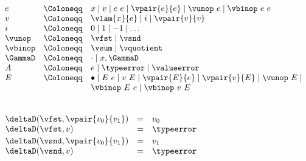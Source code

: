 \begin{flushleft}

$\begin{array}{l c l}
  e & \Coloneqq & x \mid v \mid e~e \mid \vpair{e}{e} \mid \vunop~e \mid \vbinop~e~e
\\
  v & \Coloneqq & \vlam{x}{e} \mid i \mid \vpair{v}{v}
\\
  i & \Coloneqq & 0 \mid 1 \mid -1 \mid \ldots
\\
  \vunop & \Coloneqq & \vfst \mid \vsnd
\\
  \vbinop & \Coloneqq & \vsum \mid \vquotient
\\
  \GammaD & \Coloneqq & \cdot \mid x,\GammaD
\\
  A & \Coloneqq & e \mid \typeerror \mid \valueerror
\\
  E & \Coloneqq & \bullet \mid E~e \mid v~E \mid
                  \vpair{E}{e} \mid \vpair{v}{E} \mid \vunop~E \mid
\\ & &            \vbinop~E~e \mid \vbinop~v~E
\end{array}$

\medskip
{}
\begin{mathpar}







\end{mathpar}

\medskip
{} \\
$\begin{array}{l c l}
  \deltaD(\vfst, \vpair{v_0}{v_1}) & = & v_0
\\
  \deltaD(\vfst, v) & = & \typeerror
\\[0.5ex]
  \deltaD(\vsnd, \vpair{v_0}{v_1}) & = & v_1
\\
  \deltaD(\vsnd, v) & = & \typeerror
\end{array}$


\end{flushleft}
